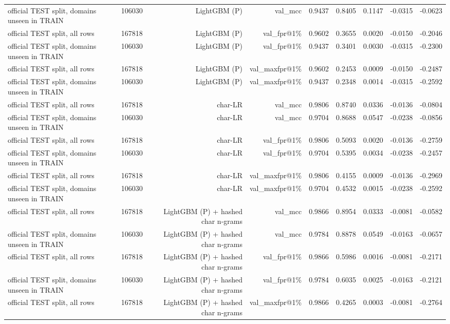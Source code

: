 \begin{table}[t]
\begin{tabular}{llrrrrrrr}
official TEST split, domains unseen in TRAIN & 106030 & LightGBM (P) & val\_mcc & 0.9437 & 0.8405 & 0.1147 & -0.0315 & -0.0623 \\
official TEST split, all rows & 167818 & LightGBM (P) & val\_fpr@1\% & 0.9602 & 0.3655 & 0.0020 & -0.0150 & -0.2046 \\
official TEST split, domains unseen in TRAIN & 106030 & LightGBM (P) & val\_fpr@1\% & 0.9437 & 0.3401 & 0.0030 & -0.0315 & -0.2300 \\
official TEST split, all rows & 167818 & LightGBM (P) & val\_maxfpr@1\% & 0.9602 & 0.2453 & 0.0009 & -0.0150 & -0.2487 \\
official TEST split, domains unseen in TRAIN & 106030 & LightGBM (P) & val\_maxfpr@1\% & 0.9437 & 0.2348 & 0.0014 & -0.0315 & -0.2592 \\
official TEST split, all rows & 167818 & char-LR & val\_mcc & 0.9806 & 0.8740 & 0.0336 & -0.0136 & -0.0804 \\
official TEST split, domains unseen in TRAIN & 106030 & char-LR & val\_mcc & 0.9704 & 0.8688 & 0.0547 & -0.0238 & -0.0856 \\
official TEST split, all rows & 167818 & char-LR & val\_fpr@1\% & 0.9806 & 0.5093 & 0.0020 & -0.0136 & -0.2759 \\
official TEST split, domains unseen in TRAIN & 106030 & char-LR & val\_fpr@1\% & 0.9704 & 0.5395 & 0.0034 & -0.0238 & -0.2457 \\
official TEST split, all rows & 167818 & char-LR & val\_maxfpr@1\% & 0.9806 & 0.4155 & 0.0009 & -0.0136 & -0.2969 \\
official TEST split, domains unseen in TRAIN & 106030 & char-LR & val\_maxfpr@1\% & 0.9704 & 0.4532 & 0.0015 & -0.0238 & -0.2592 \\
official TEST split, all rows & 167818 & LightGBM (P) + hashed char n-grams & val\_mcc & 0.9866 & 0.8954 & 0.0333 & -0.0081 & -0.0582 \\
official TEST split, domains unseen in TRAIN & 106030 & LightGBM (P) + hashed char n-grams & val\_mcc & 0.9784 & 0.8878 & 0.0549 & -0.0163 & -0.0657 \\
official TEST split, all rows & 167818 & LightGBM (P) + hashed char n-grams & val\_fpr@1\% & 0.9866 & 0.5986 & 0.0016 & -0.0081 & -0.2171 \\
official TEST split, domains unseen in TRAIN & 106030 & LightGBM (P) + hashed char n-grams & val\_fpr@1\% & 0.9784 & 0.6035 & 0.0025 & -0.0163 & -0.2121 \\
official TEST split, all rows & 167818 & LightGBM (P) + hashed char n-grams & val\_maxfpr@1\% & 0.9866 & 0.4265 & 0.0003 & -0.0081 & -0.2764 \\

\end{tabular}
\end{table}
